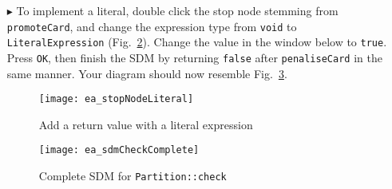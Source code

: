 \begin{itemize}
\vspace{0.5cm}

\begin{figure}[htbp]
\begin{center}
  \texttt{[image: ea\_completeActivityPenalize.pdf]}
  \caption{Story pattern for activity node \texttt{penalizeCard}}
  \label{fig:sdm_check_complete_penalize}
\end{center}
\end{figure}


\vspace{0.5cm}

To complete the \texttt{check} SDM, we need to signal (as a return value) the result of the check - was the card promoted or penalised? To do this, we need to
edit the stop nodes so they return a\emph{LiteralExpression}. This expression type can be used to specify arbitrary text, but
should really only used for true literals like 42, ``foo'' or \texttt{true}. It can be (mis)used for formulating any (Java) expression that will simply be
transferred ``literally'' into the generated code, but this is obviously sort of dirty\footnote{It defeats, for example, any attempt to guarantee type safety}
and should be avoided when possible.

\item[$\blacktriangleright$] To implement a literal, double click the stop node stemming from  \texttt{promoteCard}, and change the expression type from
\texttt{void} to \texttt{LiteralEx\-pression} (Fig.~\ref{fig:sdm_check_literal_exp}). Change the value in the window below to \texttt{true}. Press \texttt{OK},
then finish the SDM by returning \texttt{false} after \texttt{penaliseCard} in the same manner. Your diagram should now resemble
Fig.~\ref{fig:sdm_check_finish}.

\begin{figure}[htbp]
\begin{center}
  \texttt{[image: ea\_stopNodeLiteral]}
  \caption{Add a return value with a literal expression}
  \label{fig:sdm_check_literal_exp}
\end{center}
\end{figure}

\begin{figure}[htbp]
\begin{center}
  \texttt{[image: ea\_sdmCheckComplete]}
  \caption{Complete SDM for \texttt{Partition::check}}
  \label{fig:sdm_check_finish}
\end{center}
\end{figure}


\end{itemize}
